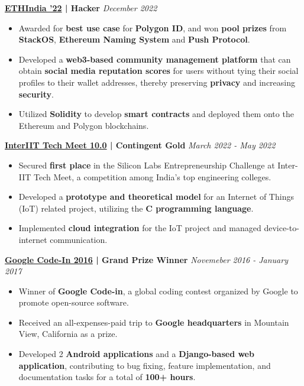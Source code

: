 \documentclass[8pt,a4paper]{extarticle}
\begin{document}
\begin{center}
    \textbf{\href{https://ethindia.co/}{ETHIndia '22} | Hacker}
    \hfill\hfill\textit{December 2022}
\end{center}
\begin{itemize}
    \item Awarded for \textbf{best use case} for \textbf{Polygon ID}, and won \textbf{pool prizes} from \textbf{StackOS}, \textbf{Ethereum Naming System} and \textbf{Push Protocol}.
    \item Developed a \textbf{web3-based community management platform} that can obtain \textbf{social media reputation scores} for users without tying their social profiles to their wallet addresses, thereby preserving \textbf{privacy} and increasing \textbf{security}.
    \item Utilized \textbf{Solidity} to develop \textbf{smart contracts} and deployed them onto the Ethereum and Polygon blockchains.
\end{itemize}
\vspace{1.5mm}

\begin{center}
    \textbf{\href{https://interiit-tech.org/}{InterIIT Tech Meet 10.0} | Contingent Gold}
    \hfill\hfill\textit{March 2022 - May 2022}
\end{center}
\begin{itemize}
    \item Secured \textbf{first place} in the Silicon Labs Entrepreneurship Challenge at Inter-IIT Tech Meet, a competition among India's top engineering colleges.
    \item Developed a \textbf{prototype and theoretical model} for an Internet of Things (IoT) related project, utilizing the \textbf{C programming language}.
    \item Implemented \textbf{cloud integration} for the IoT project and managed device-to-internet communication.
\end{itemize}
\vspace{1.5mm}

\begin{center}
    \textbf{\href{https://codein.withgoogle.com/}{Google Code-In 2016} | Grand Prize Winner}
    \hfill\hfill\textit{Novemeber 2016 - January 2017}
\end{center}
\begin{itemize}
    \item Winner of \textbf{Google Code-in}, a global coding contest organized by Google to promote open-source software.
    \item Received an all-expenses-paid trip to \textbf{Google headquarters} in Mountain View, California as a prize.
    \item Developed 2 \textbf{Android applications} and a \textbf{Django-based web application}, contributing to bug fixing, feature implementation, and documentation tasks for a total of \textbf{100+ hours}.
\end{itemize}
\end{document}
